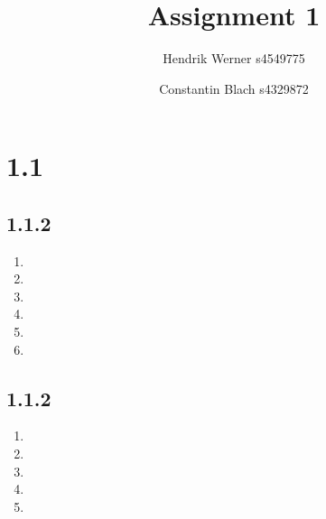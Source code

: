 \documentclass[12pt]{article}
\author{
	Hendrik Werner s4549775
	\and Constantin Blach s4329872
}
\title{Assignment 1}
\begin{document}
\maketitle

\section*{1.1}
\subsection*{1.1.2}
\begin{enumerate}[a]
	\item %
	\item %
	\item %
	\item %
	\item %
	\item %
\end{enumerate}

\subsection*{1.1.2}
\begin{enumerate}[a]
	\item %
	\item %
	\item %
	\item %
	\item %
\end{enumerate}
\end{document}
